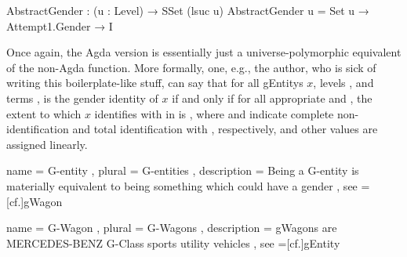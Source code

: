 \documentclass{article}
\theoremstyle{remark}
\begin{document}
\begin{code}
  AbstractGender : (u : Level) → SSet (lsuc u)
  AbstractGender u = Set u → Attempt1.Gender → I
\end{code}

Once again, the Agda version is essentially just a universe-polymorphic equivalent of the non-Agda function.  More formally, one, e.g., the author, who is sick of writing this boilerplate-like stuff, can say that for all \glspl{gEntity} \(x\), levels , and   terms ,  is the gender identity of \(x\) if and only if for all appropriate  and , the extent to which \(x\) identifies with  in  is   , where  and  indicate complete non-identification and total identification with , respectively, and other  values are assigned linearly.

\printbibliography{}

  { name = {G-entity}
  , plural = {G-entities}
  , description = Being a G-entity is materially equivalent to being something which could have a gender
  , see =[cf.]{gWagon}
  }

  { name = {G-Wagon}
  , plural = {G-Wagons}
  , description = \glspl{gWagon} are MERCEDES-BENZ G-Class sports utility vehicles
  , see =[cf.]{gEntity}
  }


\printglossary{}
\end{document}
